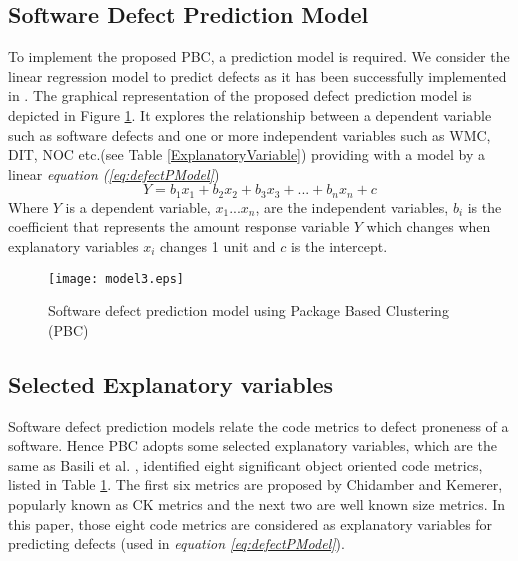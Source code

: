 \documentclass[12pt]{report}
\begin{document}
\subsection{Software Defect Prediction Model}
To implement the proposed PBC, a prediction model is required. We consider the linear regression model \cite{draper1981applied} to predict defects as it has been successfully implemented in \cite{tan2011assessing,basili1996validation}. The graphical representation of the proposed defect prediction model is depicted in {Figure \ref{defectPModel}. It explores the relationship between a dependent variable such as software defects and one or more independent variables such as WMC, DIT, NOC etc.(see Table \ref{ExplanatoryVariable}) providing with a model by a linear \textit{equation (\ref{eq:defectPModel}}) 
\begin{equation}
\label{eq:defectPModel}
 Y=b_{1}x_{1}+b_{2}x_{2}+b_{3}x_{3}+...+b_{n}x_{n}+c
\end{equation}}
Where $Y$ is a dependent variable, $x_{1}...x_{n}$, are the independent variables, $b_{i}$ is the coefficient that represents the amount response variable $Y$ which changes when explanatory variables $x_{i}$ changes 1 unit and $c$ is the intercept.

\begin{figure}[h!]
\center
      \texttt{[image: model3.eps]}
		\caption{Software defect prediction model using Package Based Clustering (PBC)}
		\label{defectPModel}	
\end{figure}



\subsection{Selected Explanatory variables}
Software defect prediction models relate the code metrics to defect proneness of a software. Hence PBC adopts some selected explanatory variables, which are the same as Basili et al. \cite{basili1996validation}, identified eight significant object oriented code metrics, listed in Table \ref{defectPModel}. The first six metrics are proposed by Chidamber and Kemerer, popularly known as CK metrics \cite{chidamber1994metrics} and the next two are well known size metrics. In this paper, those eight code metrics are considered as explanatory variables for predicting defects (used in \textit{equation \ref{eq:defectPModel}}).
\end{document}
